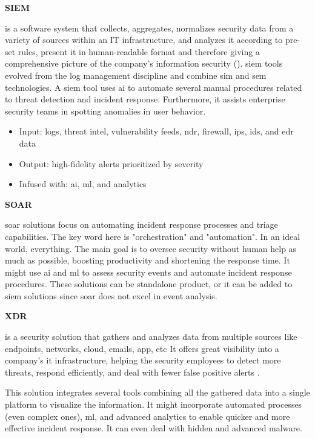 \begin{multicols}{2}
      \textbf{SIEM}

      is a software system that collects, aggregates, normalizes security data from a variety of sources within an IT infrastructure, and
      analyzes it according to pre-set rules, present it in human-readable format and therefore giving a comprehensive picture of the company's
      information security (\cite{siemGartner}). \acrshort{siem} tools evolved from the log management discipline and combine \acrshort{sim} and
      \acrshort{sem} technologies. A \acrshort{siem} tool uses \acrshort{ai} to automate several manual procedures related to threat
      detection and incident response. Furthermore, it assists enterprise security teams in spotting anomalies in user behavior.

      \begin{itemize}
            \item Input: logs, threat intel, vulnerability feeds, \acrshort{ndr}, firewall, \acrshort{ips}, \acrshort{ids}, and \acrshort{edr}
                  data
            \item Output: high-fidelity alerts prioritized by severity
            \item Infused with: \acrshort{ai}, \acrshort{ml}, and analytics
      \end{itemize}

      \textbf{SOAR}

      \acrshort{soar} solutions focus on automating incident response processes and triage capabilities. The key word here is
      "orchestration" and "automation". In an ideal world, everything.
      The main goal is to oversee security without human help as much as possible, boosting productivity and shortening the response time.
      It might use \acrshort{ai} and \acrshort{ml} to assess security events and automate incident response procedures. These solutions
      can be standalone product, or it can be added to \acrshort{siem} solutions since \acrshort{soar} does not excel in event analysis.

      \textbf{XDR}

      is a security solution that gathers and analyzes data from multiple sources like endpoints, networks, cloud, emails, app,
      \acrshort{etc} It offers great visibility into a company's \acrshort{it} infrastructure, helping the security employees to detect
      more threats, respond efficiently, and deal with fewer false positive alerts \cite{xdrIDC}.

      This solution integrates several tools combining all the gathered data into a single platform to visualize the information. It might
      incorporate automated processes (even complex ones), \acrshort{ml}, and advanced analytics to enable quicker and more effective
      incident response. It can even deal with hidden and advanced malware.


\end{multicols}

